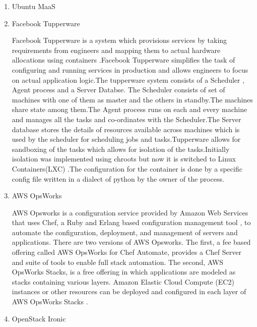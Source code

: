 \begin{enumerate}
\item {} 
Ubuntu MaaS

\item {} 
Facebook Tupperware

Facebook Tupperware is a system which provisions services by
taking requirements from engineers and mapping them to actual
hardware allocations using containers
\label{\detokenize{i524/technologies:id598}}{\hyperref[\detokenize{i524/technologies:www-facetup}]{\sphinxcrossref{{[}516{]}}}}.Facebook Tupperware simplifies the task of
configuring and running services in production and allows
engineers to focus on actual application logic.The tupperware
system consists of a Scheduler , Agent process and a Server
Databse.  The Scheduler consists of set of machines with one of
them as master and the others in standby.The machines share state
among them.The Agent process runs on each and every machine and
manages all the tasks and co-ordinates with the Scheduler.The
Server database stores the details of resources available across
machines which is used by the scheduler for scheduling jobs and
tasks.Tupperware allows for sandboxing of the tasks which allows
for isolation of the tasks.Initially isolation was implemented
using chroots but now it is switched to Linux Containers(LXC)
.The configuration for the container is done by a specific config
file written in a dialect of python by the owner of the process.

\item {} 
AWS OpsWorks

AWS Opsworks is a configuration service provided by Amazon Web
Services that uses Chef, a Ruby and Erlang based configuration
management tool \label{\detokenize{i524/technologies:id599}}{\hyperref[\detokenize{i524/technologies:www-wikichef}]{\sphinxcrossref{{[}517{]}}}}, to automate the
configuration, deployment, and management of servers and
applications. There are two versions of AWS Opsworks.
The first, a fee based offering called AWS OpsWorks for Chef
Automate, provides a Chef Server and suite of tools to enable
full stack automation. The second, AWS OpsWorks Stacks, is a
free offering in which applications are modeled as stacks
containing various layers. Amazon Elastic Cloud Compute (EC2)
instances or other resources can be deployed and configured
in each layer of AWS OpsWorks Stacks \label{\detokenize{i524/technologies:id600}}{\hyperref[\detokenize{i524/technologies:www-awsopsworks}]{\sphinxcrossref{{[}518{]}}}}.

\item {} 
OpenStack Ironic


\end{enumerate}

